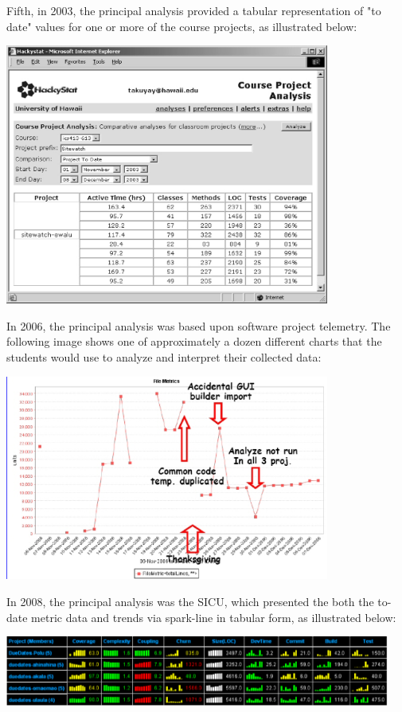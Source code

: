 \documentclass[11pt]{article}
\begin{document}
Fifth, in 2003, the principal analysis provided a tabular representation of "to date" values for one or more of the course projects, as illustrated below:

\includegraphics[width=0.8\textwidth]{course-project-analysis-to-date-2003}

In 2006, the principal analysis was based upon software project telemetry. The following image shows one of approximately a dozen different charts that the students would use to analyze and interpret their collected data:

\includegraphics[width=0.8\textwidth]{telemetry-2006}

In 2008, the principal analysis was the SICU, which presented the both the to-date metric data and trends via spark-line in tabular form, as illustrated below:

\includegraphics[width=0.95\textwidth]{portfolio-2008}
\end{document}
